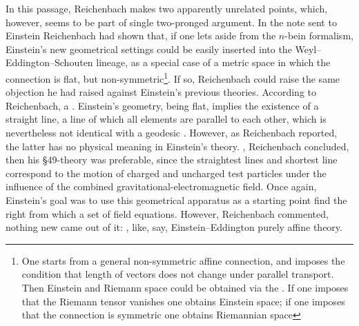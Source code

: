\documentclass[draft]{article}
\newcommand{\manu}[1]{\citep[#1]{Reichenbach1928b}}
\newcommand{\nbein}{$n$-bein\xspace}
\begin{document}
In this passage, Reichenbach makes two apparently unrelated points, which, however, seems to be part of single two-pronged argument. In the note sent to Einstein Reichenbach had shown that, if one lets aside from the \nbein formalism, Einstein's new geometrical settings could be easily inserted into the Weyl--Eddington--Schouten lineage, as a special case of a metric space in which the connection is flat, but non-symmetric\footnote{One starts from a general non-symmetric affine \Gtmn connection, and imposes the condition that length of vectors does not change under parallel transport. Then Einstein and Riemann space could be obtained via the  \manu{5}. If one imposes that the Riemann tensor vanishes one obtains Einstein space; if one imposes that the connection is symmetric one obtains Riemannian space}. If so, Reichenbach could raise the same objection he had raised against Einstein's previous theories. According to Reichenbach, a  \manu{7}. Einstein's geometry, being flat, implies the existence of a straight line, a line of which all elements are parallel to each other, which is nevertheless not identical with a geodesic \citep[224]{Einstein19282}. However, as Reichenbach reported, the latter has no physical meaning in Einstein's theory.  , Reichenbach concluded, then his \S49-theory was preferable, since the straightest lines and shortest line correspond to the motion of charged and uncharged test particles under the influence of the combined gravitational-electromagnetic field. Once again, Einstein's goal was to use this geometrical apparatus as a starting point find the right  from which a set of field equations. However, Reichenbach commented, nothing new came out of it:  \manu{6}, like, say, Einstein--Eddington purely affine theory. 



\end{document}
